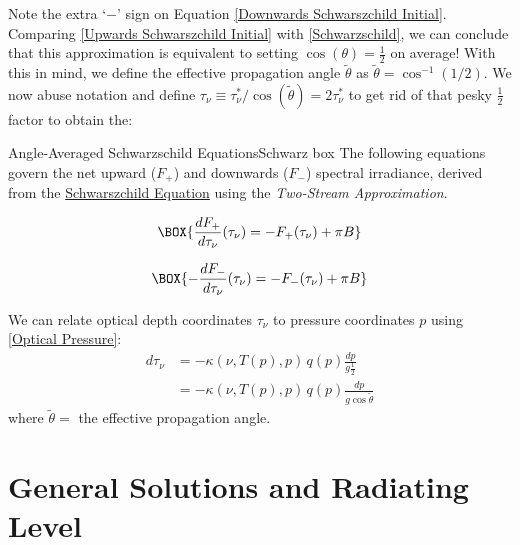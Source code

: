 Note the extra `$-$' sign on Equation \ref{Downwards Schwarszchild Initial}. Comparing \ref{Upwards Schwarszchild Initial} with \ref{Schwarzschild}, we can conclude that this approximation is equivalent to setting $\cos(\theta)=\frac{1}{2}$ on average! With this in mind, we define the effective propagation angle $\tilde{\theta}$ as $\tilde{\theta}=\cos^{-1}(1/2)$. We now abuse notation and define $\tau_\nu\equiv \tau_\nu^*/\cos(\tilde{\theta})=2\tau_\nu^*$ to get rid of that pesky $\frac{1}{2}$ factor to obtain the: 
\begin{fact}{Angle-Averaged Schwarzschild Equations}{Schwarz box}\label{Scharz box}
    The following equations govern the net upward ($F_+$) and downwards ($F_-$) spectral irradiance, derived from the \hyperref[Schwarzschild]{Schwarszchild Equation} using the \textit{Two-Stream Approximation}.

    \begin{minipage}{.5\linewidth}
        \begin{gather}
        \label{Upwards Schwarzschild}
        \BOX{\frac{dF_+}{d\tau_\nu}(\tau_\nu)=-F_+(\tau_\nu)+\pi B}
        \end{gather}
    \end{minipage}
    \begin{minipage}{.5\linewidth}
        \begin{gather}
        \label{Downwards Schwarzschild}
        \BOX{-\frac{dF_-}{d\tau_\nu}(\tau_\nu)=-F_-(\tau_\nu)+\pi B}
        \end{gather}
    \end{minipage}

    We can relate optical depth coordinates $\tau_\nu$ to pressure coordinates $p$ using \ref{Optical Pressure}:
    \begin{align}
        d\tau_\nu&=-\kappa(\nu,T(p),p)\,q(p)\frac{dp}{g\frac{1}{2}}\\
        &=-\kappa(\nu,T(p),p)\,q(p)\frac{dp}{g\cos\tilde{\theta}}
    \end{align}
    where $\tilde{\theta}=$ the effective propagation angle.
\end{fact}


\section{General Solutions and Radiating Level}


